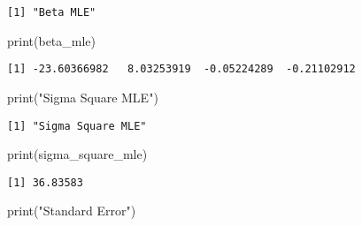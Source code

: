 \documentclass[
  letterpaper,
  DIV=11,
  numbers=noendperiod]{scrartcl}
\newenvironment{Shaded}{\begin{snugshade}}{\end{snugshade}}
\newcommand{\CommentTok}[1]{\textcolor[rgb]{0.37,0.37,0.37}{#1}}
\newcommand{\DecValTok}[1]{\textcolor[rgb]{0.68,0.00,0.00}{#1}}
\newcommand{\FunctionTok}[1]{\textcolor[rgb]{0.28,0.35,0.67}{#1}}
\newcommand{\NormalTok}[1]{\textcolor[rgb]{0.00,0.23,0.31}{#1}}
\newcommand{\OtherTok}[1]{\textcolor[rgb]{0.00,0.23,0.31}{#1}}
\newcommand{\SpecialCharTok}[1]{\textcolor[rgb]{0.37,0.37,0.37}{#1}}
\newcommand{\StringTok}[1]{\textcolor[rgb]{0.13,0.47,0.30}{#1}}
\begin{document}
\begin{Shaded}
\end{Shaded}

\begin{verbatim}
[1] "Beta MLE"
\end{verbatim}

\begin{Shaded}
\begin{Highlighting}[]
\FunctionTok{print}\NormalTok{(beta\_mle)}
\end{Highlighting}
\end{Shaded}

\begin{verbatim}
[1] -23.60366982   8.03253919  -0.05224289  -0.21102912
\end{verbatim}

\begin{Shaded}
\begin{Highlighting}[]
\FunctionTok{print}\NormalTok{(}\StringTok{"Sigma Square MLE"}\NormalTok{)}
\end{Highlighting}
\end{Shaded}

\begin{verbatim}
[1] "Sigma Square MLE"
\end{verbatim}

\begin{Shaded}
\begin{Highlighting}[]
\FunctionTok{print}\NormalTok{(sigma\_square\_mle)}
\end{Highlighting}
\end{Shaded}

\begin{verbatim}
[1] 36.83583
\end{verbatim}

\begin{Shaded}
\begin{Highlighting}[]
\FunctionTok{print}\NormalTok{(}\StringTok{"Standard Error"}\NormalTok{)}
\end{Highlighting}
\end{Shaded}
\end{document}
